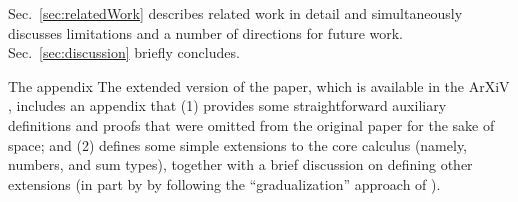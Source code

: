 Sec.~\ref{sec:relatedWork} describes related work in detail and simultaneously discusses limitations and a number of directions for future work. Sec.~\ref{sec:discussion} briefly concludes. 

\ifarxiv
The appendix 
\else
The extended version of the paper, which is available in the ArXiV \cite{2018arXiv180500155O}, includes an appendix that 
\fi
(1) provides some straightforward auxiliary definitions and proofs that were omitted from the \ifarxiv original \fi paper  for the sake of space; and (2) defines some simple extensions to the core calculus (namely, numbers, and sum types), together with a brief discussion on defining other extensions (in part by by following the ``gradualization'' approach of \citet{DBLP:conf/popl/CiminiS16}). 
